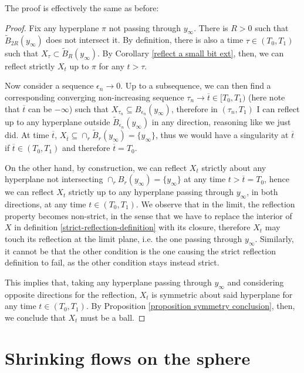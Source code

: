 The proof is effectively the same as before: 
\begin{proof}
	Fix any hyperplane $\pi$ not passing through $y_\infty$. There is $R>0$ such that $ \tilde{B}_{2R}(y_\infty)$ does not intersect it. By definition, there is also a time  $\tau \in  (T_0, T_1)$ such that $X_\tau \subset \tilde{B}_R(y_\infty)$. 
	By Corollary \ref{reflect a small bit ext}, then, we can reflect strictly $X_t$ up to $\pi$ for any $t>\tau$. 
	
	Now consider a sequence  $\epsilon_n\rightarrow 0$. Up to a subsequence, we can then find a corresponding converging non-increasing sequence $\tau_n\rightarrow \overline{t}\in [T_0, T_1)$ (here note that $\overline{t}$ can be $-\infty$) such that $X_{\tau_n}\subseteq B_{\epsilon_n}(y_\infty)$, therefore in $(\tau_n, T_1)$ I can reflect up to any hyperplane outside  $\tilde{B}_{\epsilon_n}(y_\infty)$ in any direction, reasoning like we just did. At time $\overline{t}$, $X_{\overline{t}} \subseteq \cap_r  \tilde{B}_{r}(y_\infty) = \{y_\infty\}$, thus we would have a singularity at $\overline{t}$ if  $\overline{t}\in(T_0, T_1)$ and therefore $\overline{t}=T_0$. 
	
	On the other hand, by construction, we can reflect $X_{t}$ strictly about any hyperplane not intersecting $\cap_r B_{r}(y_\infty) = \{y_\infty\}$ at any time $t>\overline{t}=T_0$, hence we can reflect $X_{t}$ strictly up to any hyperplane passing through $y_\infty$, in both directions, at any  time $t\in (T_0, T_1)$. We observe that in the limit, the reflection property becomes non-strict, in the sense that we have to replace the interior of $X$ in definition \ref{strict-reflection-definition} with its closure, therefore $X_{t}$ may touch its reflection at the limit plane, i.e. the one passing through $y_\infty$. Similarly, it cannot be that the other condition is the one causing the strict reflection definition to fail, as the other condition stays instead strict. 
	
	This implies that, taking any hyperplane passing through $y_\infty$ and considering opposite directions for the reflection, $X_{t}$ is symmetric about said hyperplane for any time $t\in (T_0, T_1)$. By Proposition \ref{proposition symmetry conclusion}, then, we conclude that $X_{t}$ must be a ball.	
\end{proof}

\section{Shrinking flows on the sphere}

